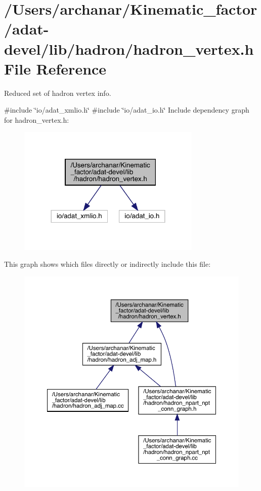 \hypertarget{adat-devel_2lib_2hadron_2hadron__vertex_8h}{}\section{/\+Users/archanar/\+Kinematic\+\_\+factor/adat-\/devel/lib/hadron/hadron\+\_\+vertex.h File Reference}
\label{adat-devel_2lib_2hadron_2hadron__vertex_8h}


Reduced set of hadron vertex info.  


{\ttfamily \#include \char`\"{}io/adat\+\_\+xmlio.\+h\char`\"{}}\newline
{\ttfamily \#include \char`\"{}io/adat\+\_\+io.\+h\char`\"{}}\newline
Include dependency graph for hadron\+\_\+vertex.\+h\+:
\nopagebreak
\begin{figure}[H]
\begin{center}
\leavevmode
\includegraphics[width=248pt]{d4/d11/adat-devel_2lib_2hadron_2hadron__vertex_8h__incl}
\end{center}
\end{figure}
This graph shows which files directly or indirectly include this file\+:
\nopagebreak
\begin{figure}[H]
\begin{center}
\leavevmode
\includegraphics[width=350pt]{d3/db8/adat-devel_2lib_2hadron_2hadron__vertex_8h__dep__incl}
\end{center}
\end{figure}
